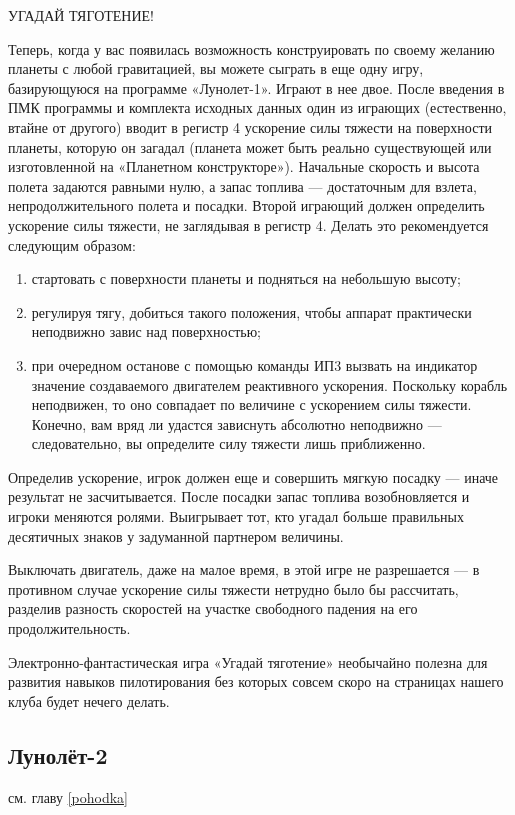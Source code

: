 \documentclass[11pt,a4paper,oneside]{article}
\begin{document}
УГАДАЙ ТЯГОТЕНИЕ!

Теперь, когда у вас появилась возможность конструировать по своему желанию планеты с любой гравитацией, вы можете сыграть в еще одну игру, базирующуюся на программе «Лунолет-1». Играют в нее двое. После введения в ПМК программы и комплекта исходных данных один из играющих (естественно, втайне от другого) вводит в регистр 4 ускорение силы тяжести на поверхности планеты, которую он загадал (планета может быть реально существующей или изготовленной на «Планетном конструкторе»). Начальные скорость и высота полета задаются равными нулю, а запас топлива — достаточным для взлета, непродолжительного полета и посадки. Второй играющий должен определить ускорение силы тяжести, не заглядывая в регистр 4. Делать это рекомендуется следующим образом:
\begin{enumerate}
\item стартовать с поверхности планеты и подняться на небольшую высоту; 
\item регулируя тягу, добиться такого положения, чтобы аппарат практически неподвижно завис над поверхностью;
\item при очередном останове с помощью команды ИП3 вызвать на индикатор значение создаваемого двигателем реактивного ускорения. Поскольку корабль неподвижен, то оно совпадает по величине с ускорением силы тяжести. Конечно, вам вряд ли удастся зависнуть абсолютно неподвижно — следовательно, вы определите силу тяжести лишь приближенно. 
\end{enumerate}

Определив ускорение, игрок должен еще и совершить мягкую посадку — иначе результат не засчитывается. После посадки запас топлива возобновляется и игроки меняются ролями. Выигрывает тот, кто угадал больше правильных десятичных знаков у задуманной партнером величины.

Выключать двигатель, даже на малое время, в этой игре не разрешается — в противном случае ускорение силы тяжести нетрудно было бы рассчитать, разделив разность скоростей на участке свободного падения на его продолжительность.

Электронно-фантастическая игра «Угадай тяготение» необычайно полезна для развития навыков пилотирования без которых совсем скоро на страницах нашего клуба будет нечего делать.

\subsection{Лунолёт-2}
см. главу \ref{pohodka}
\end{document}
